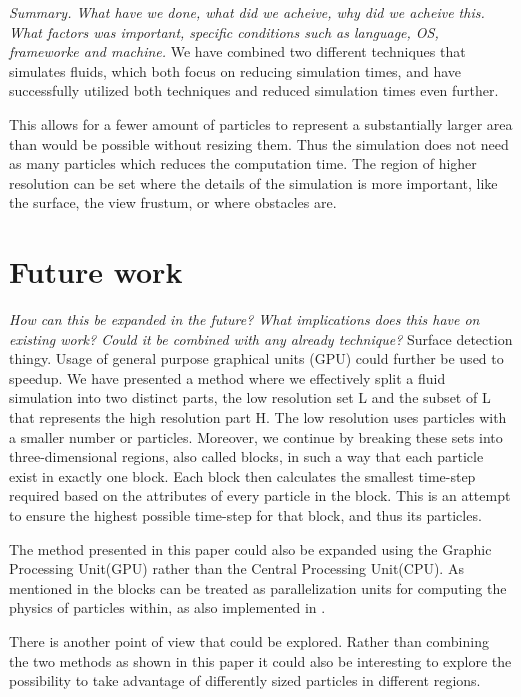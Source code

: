 \documentclass[../../main.tex]{subfiles}
\begin{document}


\textit{Summary. What have we done, what did we acheive, why did we acheive this. What factors was important, specific conditions such as language, OS, frameworke and machine.}
We have combined two different techniques that simulates fluids, which both focus on reducing simulation times, and have successfully utilized both techniques and reduced simulation times even further.

This allows for a fewer amount of particles to represent a substantially larger area than would be possible without resizing them. Thus the simulation does not need as many particles which reduces the computation time. The region of higher resolution can be set where the details of the simulation is more important, like the surface, the view frustum, or where obstacles are.


\section{Future work}
\textit{How can this be expanded in the future? What implications does this have on existing work? Could it be combined with any already technique?}
Surface detection thingy. 
Usage of general purpose graphical units (GPU) could further be used to speedup. 
We have presented a method where we effectively split a fluid simulation into two distinct parts, the low resolution set L and the subset of L that represents the high resolution part H. The low resolution uses particles with a smaller number or particles.
Moreover, we continue by breaking these sets into three-dimensional regions, also called blocks, in such a way that each particle exist in exactly one block. Each block then calculates the smallest time-step required based on the attributes of every particle in the block. This is an attempt to ensure the highest possible time-step for that block, and thus its particles. 

The method presented in this paper could also be expanded using the Graphic Processing Unit(GPU) rather than the Central Processing Unit(CPU). As mentioned in \cite{goswami2014regional} the blocks can be treated as parallelization units for computing the physics of particles within, as also implemented in \cite{goswami2010interactive}.

There is another point of view that could be explored. Rather than combining the two methods as shown in this paper it could also be interesting to explore the possibility to take advantage of differently sized particles in different regions.
\end{document}
